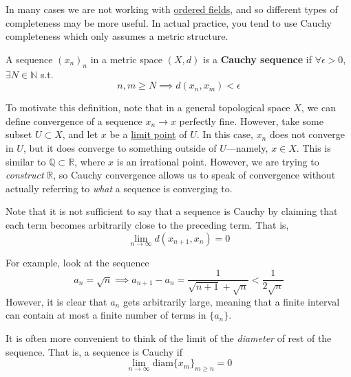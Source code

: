   In many cases we are not working with \hyperref[alg-def:ordered-field]{ordered fields}, and so different types of completeness may be more useful. In actual practice, you tend to use Cauchy completeness which only assumes a metric structure. 

  \begin{definition}
    \label{def:cauchy-sequence}
    A sequence $(x_n)_n$ in a metric space $(X, d)$ is a \textbf{Cauchy sequence} if $\forall \epsilon > 0$, $\exists N \in \mathbb{N}$ s.t.  
    \begin{equation}
      n, m \geq N \implies d(x_n, x_m) < \epsilon
    \end{equation}
  \end{definition}

  To motivate this definition, note that in a general topological space $X$, we can define convergence of a sequence $x_n \to x$ perfectly fine. However, take some subset $U \subset X$, and let $x$ be a \hyperref[pst-def:limit-point]{limit point} of $U$. In this case, $x_n$ does not converge in $U$, but it does converge to something outside of $U$---namely, $x \in X$. This is similar to $\mathbb{Q} \subset \mathbb{R}$, where $x$ is an irrational point. However, we are trying to \textit{construct} $\mathbb{R}$, so Cauchy convergence allows us to speak of convergence without actually referring to \textit{what} a sequence is converging to. 

  Note that it is not sufficient to say that a sequence is Cauchy by claiming that each term becomes arbitrarily close to the preceding term. That is, 
  \begin{equation}
    \lim_{n \rightarrow \infty} d(x_{n+1}, x_{n}) = 0
  \end{equation}

  \begin{example}
    \label{ex:adjacent-terms-converging-doesnt-imply-sequence}
    For example, look at the sequence 
    \begin{equation}
      a_n = \sqrt{n} \implies a_{n+1} - a_{n} = \frac{1}{\sqrt{n+1} + \sqrt{n}} < \frac{1}{2\sqrt{n}}
    \end{equation}
    However, it is clear that $a_n$ gets arbitrarily large, meaning that a finite interval can contain at most a finite number of terms in $\{a_n\}$. 
  \end{example}

  It is often more convenient to think of the limit of the \textit{diameter} of rest of the sequence. That is, a sequence is Cauchy if 
  \begin{equation}
    \lim_{n \rightarrow \infty} \mathrm{diam}\{x_{m}\}_{m \geq n} = 0
  \end{equation}


